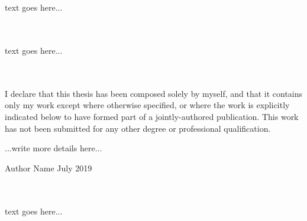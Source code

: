 

\newpage
{}\\ \\

text goes here...


\newpage
{}\\ \\

text goes here...


\newpage
{}\\ \\

I declare that this thesis has been composed solely by myself, and that it contains only my work except where otherwise specified, or where the work is explicitly indicated below to have formed part of a jointly-authored publication. This work has not been submitted for any other degree or professional qualification.\newline

\noindent
...write more details here...

\begin{flushright}
\hspace*{\fill}Author Name\newline
July 2019
\end{flushright}


\newpage
{}\\ \\

text goes here...

\newpage


\tableofcontents
\listoffigures
\listoftables
\printglossary